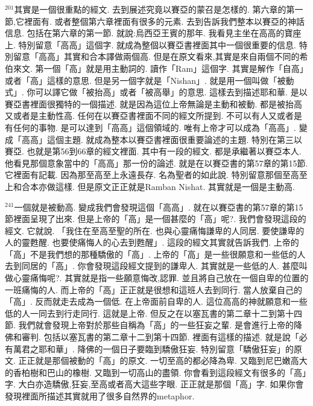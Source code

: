 \documentclass{book}
\begin{document}
$^{201}$其實是一個很重點的經文.
去到展述究竟以賽亞的蒙召是怎樣的.
第六章的第一節,它裡面有.
或者整個第六章裡面有很多的元素.
去到告訴我們整本以賽亞的神話信息.
包括在第六章的第一節.
就說:烏西亞王賓的那年.
我看見主坐在高高的寶座上.
特別留意「高高」這個字.
就成為整個以賽亞書裡面其中一個很重要的信息.
特別留意「高高」其實和合本譯做兩個高.
但是在原文看來,其實是來自兩個不同的希伯來文.
第一個「高」就是用主動詞的.
讀作「Ram」這個字.
其實是解作「自高」或者「高」這樣的意思.
但是另一個字就是「Nishan」.
就是用一個叫做「被動式」.
你可以譯它做「被抬高」或者「被高舉」的意思.
這樣去到描述耶和華.
是以賽亞書裡面很獨特的一個描述.
就是因為這位上帝無論是主動和被動.
都是被抬高又或者是主動性高.
任何在以賽亞書裡面不同的經文所提到.
不可以有人又或者是有任何的事物.
是可以達到「高高」這個領域的.
唯有上帝才可以成為「高高」.
變成「高高」這個主題.
就成為整本以賽亞書裡面很重要論述的主題.
特別在第三以賽亞.
也就是第56到66章的經文裡面.
其中有一段的經文.
都是承繼著以賽亞本人.
他看見那個意象當中的「高高」那一份的論述.
就是在以賽亞書的第57章的第15節.
它裡面有記載.
因為那至高至上永遠長存.
名為聖者的如此說.
特別留意那個至高至上和合本亦做這樣.
但是原文正正就是Ramban Nishat.
其實就是一個是主動高.

$^{241}$一個就是被動高.
變成我們會發現這個「高高」.
就在以賽亞書的第57章的第15節裡面呈現了出來.
但是上帝的「高」是一個甚麼的「高」呢?.
我們會發現這段的經文.
它就說.
「我住在至高至聖的所在.
也與心靈痛悔謙卑的人同居.
要使謙卑的人的靈甦醒.
也要使痛悔人的心去到甦醒」.
這段的經文其實就告訴我們.
上帝的「高」不是我們想的那種驕傲的「高」.
上帝的「高」是一些很願意和一些低的人去到同居的「高」.
你會發現這段經文提到的謙卑人.
其實就是一些低的人.
甚麼叫做心靈痛悔呢?.
其實就是指一些願意悔改,認罪.
並且將自己放在一個自卑的位置的一班痛悔的人.
而上帝的「高」正正就是很想和這班人去到同行.
當人放棄自己的「高」.
反而就走去成為一個低.
在上帝面前自卑的人.
這位高高的神就願意和一些低的人一同去到行走同行.
這就是上帝.
但反之在以塞瓦書的第二章十二到第十四節.
我們就會發現上帝對於那些自稱為「高」的一些狂妄之輩.
是會進行上帝的降佛和審判.
包括以塞瓦書的第二章十二到第十四節.
裡面有這樣的描述.
就是說「必有萬君之耶和華」.
降佛的一個日子要臨到驕傲狂妄.
特別留意「驕傲狂妄」的原文.
正正就是那個被動的「高」的原文.
一切至高的都必降為卑.
又臨到尼巴嫩高大的香柏樹和巴山的橡樹.
又臨到一切高山的盡領.
你會看到這段經文有很多的「高」字.
大白亦造驕傲,狂妄,至高或者高大這些字眼.
正正就是那個「高」字.
如果你會發現裡面所描述其實就用了很多自然界的metaphor.
\end{document}
